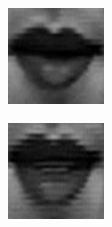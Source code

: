 \begin{figure}
\begin{subfigure}[b]{0.15\textwidth}
	  \caption{}
		\label{fig:timeseriesHappy:b}
	\end{subfigure}
	\begin{subfigure}[b]{0.15\textwidth}
		\includegraphics[width=\textwidth]{./img/timeseriesHappy/S026_006_00000003_conew1.png}
		\caption{}
		\label{fig:timeseriesHappy:c}
	\end{subfigure}
	\begin{subfigure}[b]{0.15\textwidth}
		\includegraphics[width=\textwidth]{./img/timeseriesHappy/S026_006_00000004.png}

\end{subfigure}
\end{figure}
